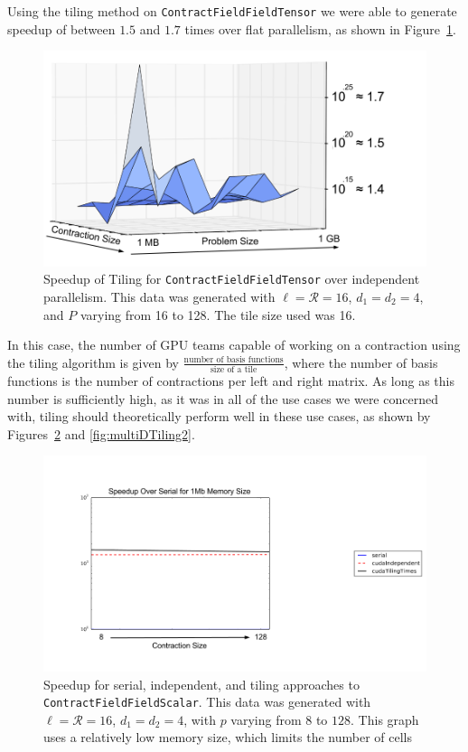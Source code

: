 Using the tiling method on \texttt{ContractFieldFieldTensor} we were able to generate speedup of between $1.5$ and $1.7$ times over flat parallelism, as shown in Figure~\ref{fig:CFFTSpeedup}. 

\begin{figure}[H]
    \centering
\includegraphics[width=5in]{ContractFieldFieldTensor}
\caption[\texttt{ContractFieldFieldScalar} Tiling performance]{Speedup of Tiling
    for \texttt{ContractFieldFieldTensor} over independent parallelism. This data was
    generated with $\ell = \mathcal{R} = 16$, $d_1 =
d_2 = 4$, and $P$ varying from 16 to 128. The tile size used was 16.}
\label{fig:CFFTSpeedup}
\end{figure}

In this case, the number of GPU teams
capable of working on a contraction using the tiling algorithm is given by
$\frac{\text{number of basis functions}}{\text{size of a tile}}$, where the number of basis functions
is the number of contractions per left and right matrix. As long as this number
is sufficiently high, as it was in all of the use cases we were concerned with, 
tiling should theoretically perform well in these use cases, as shown by
Figures~\ref{fig:multiDTiling1} and \ref{fig:multiDTiling2}.

\begin{figure}[H]
    \centering
    \includegraphics[width=5in]{CFFTTiling1}
    \caption[\texttt{ContractFieldFieldScalar} tiling (small
    memory)]{Speedup for serial, independent, and tiling approaches to
        \texttt{ContractFieldFieldScalar}.  This data was generated with
        $\ell=\mathcal{R}=16$, $d_1=d_2=4$, with $p$
varying from $8$ to $128$. This graph uses a relatively low memory size, which
limits the number of cells}
\label{fig:multiDTiling1}
\end{figure}

